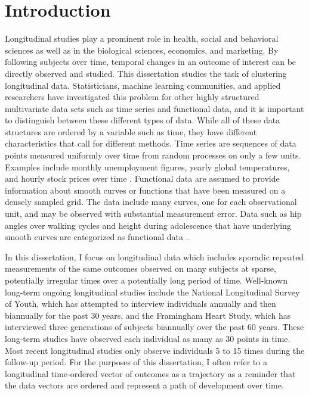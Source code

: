 \chapter{Introduction}\label{chap:intro}

Longitudinal studies play a prominent role in health, social and behavioral sciences as well as in the biological sciences, economics, and marketing. By following subjects over time, temporal changes in an outcome of interest can be directly observed and studied. This dissertation studies the task of clustering longitudinal data. Statisticians, machine learning communities, and applied researchers have investigated this problem for other highly structured multivariate data sets such as time series and functional data, and it is important to distinguish between these different types of data. While all of these data structures are ordered by a variable such as time, they have different characteristics that call for different methods. Time series are sequences of data points measured uniformly over time from random processes on only a few units. Examples include monthly unemployment figures, yearly global temperatures, and hourly stock prices over time \cite{shumway2011}. Functional data are assumed to provide information about smooth curves or functions that have been measured on a densely sampled grid. The data include many curves, one for each observational unit, and may be observed with substantial measurement error. Data such as hip angles over walking cycles and height during adolescence that have underlying smooth curves are categorized as functional data \cite{ramsay2002,ramsay2005}. 

In this dissertation, I focus on longitudinal data which includes sporadic repeated measurements of the same outcomes observed on many subjects at sparse, potentially irregular times over a potentially long period of time. Well-known long-term ongoing longitudinal studies include the National Longitudinal Survey of Youth, which has attempted to interview individuals annually and then biannually for the past 30 years, and the Framingham Heart Study, which has interviewed three generations of subjects biannually over the past 60 years. These long-term studies have observed each individual as many as 30 points in time. Most recent longitudinal studies only observe individuals 5 to 15 times during the follow-up period. For the purposes of this dissertation, I often refer to a longitudinal time-ordered vector of outcomes as a trajectory as a reminder that the data vectors are ordered and represent a path of development over time. 

